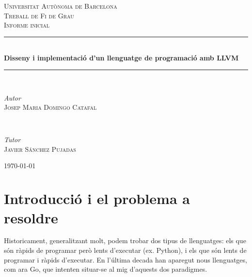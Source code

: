 ﻿\documentclass{article}
\begin{document}
\begin{titlepage}
	\newcommand{\HRule}{\rule{\linewidth}{0.4mm}} %
	
	\center

    \vspace*{25px}
	
	\textsc{\LARGE Universitat Autònoma de Barcelona}\\[1.5cm]
	
	\textsc{\Large Treball de Fi de Grau}\\[0.5cm]
	
	\textsc{\Large Informe inicial}\\[0.5cm]
	
	\HRule\\[0.4cm]
	
	{\LARGE\bfseries Disseny i implementació d'un llenguatge de programació amb LLVM}\\[0.4cm]
	
	\HRule\\[1.5cm]
	
	
	\begin{minipage}{0.5\textwidth}
		\begin{flushleft}
			\large
			\textit{Autor}\\
			\textsc{Josep Maria Domingo Catafal}
		\end{flushleft}
	\end{minipage}
	~
	\begin{minipage}{0.4\textwidth}
		\begin{flushright}
			\large
			\textit{Tutor}\\
			\textsc{Javier Sánchez Pujadas}
		\end{flushright}
	\end{minipage}
	

	\vfill\vfill\vfill %
	
	{\large\today} %

	\vfill %
\end{titlepage}

\section{Introducció i el problema a resoldre}
Historicament, generalitzant molt, podem trobar dos tipus de llenguatges: els que 
són ràpids de programar però lents d'executar (ex. Python), i els que són lents 
de programar i ràpids d'executar. En l'última decada han aparegut nous
llenguatges, com ara Go, que intenten situar-se al mig d'aquests dos paradigmes.
\end{document}
